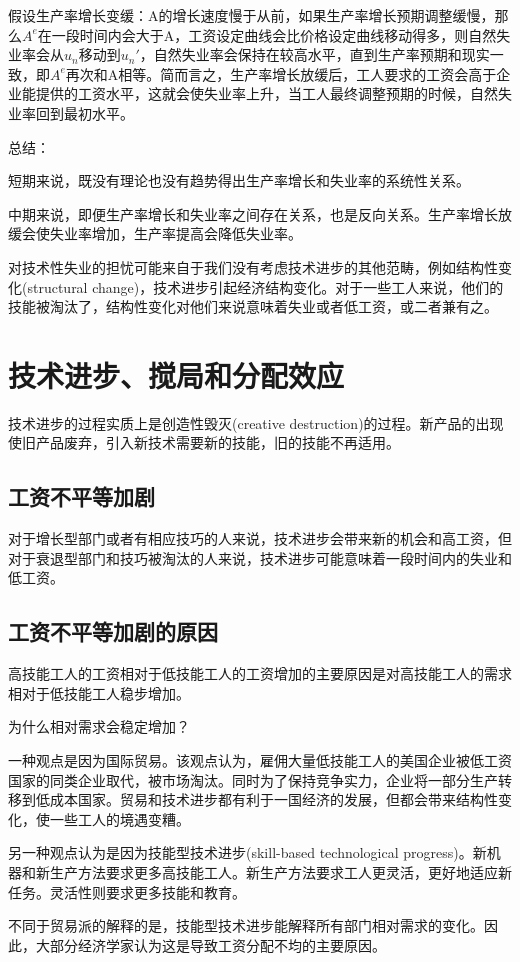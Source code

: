 \documentclass{article}
\begin{document}
假设生产率增长变缓：A的增长速度慢于从前，如果生产率增长预期调整缓慢，那么$ A^e $在一段时间内会大于A，工资设定曲线会比价格设定曲线移动得多，则自然失业率会从$ u_n $移动到$ u_n' $，自然失业率会保持在较高水平，直到生产率预期和现实一致，即$ A^e $再次和A相等。简而言之，生产率增长放缓后，工人要求的工资会高于企业能提供的工资水平，这就会使失业率上升，当工人最终调整预期的时候，自然失业率回到最初水平。

\hspace*{\fill}

总结：

短期来说，既没有理论也没有趋势得出生产率增长和失业率的系统性关系。

中期来说，即便生产率增长和失业率之间存在关系，也是反向关系。生产率增长放缓会使失业率增加，生产率提高会降低失业率。

对技术性失业的担忧可能来自于我们没有考虑技术进步的其他范畴，例如结构性变化(structural change)，技术进步引起经济结构变化。对于一些工人来说，他们的技能被淘汰了，结构性变化对他们来说意味着失业或者低工资，或二者兼有之。

\section{技术进步、搅局和分配效应}

技术进步的过程实质上是创造性毁灭(creative destruction)的过程。新产品的出现使旧产品废弃，引入新技术需要新的技能，旧的技能不再适用。

\subsection{工资不平等加剧}

对于增长型部门或者有相应技巧的人来说，技术进步会带来新的机会和高工资，但对于衰退型部门和技巧被淘汰的人来说，技术进步可能意味着一段时间内的失业和低工资。

\subsection{工资不平等加剧的原因}

高技能工人的工资相对于低技能工人的工资增加的主要原因是对高技能工人的需求相对于低技能工人稳步增加。

为什么相对需求会稳定增加？

一种观点是因为国际贸易。该观点认为，雇佣大量低技能工人的美国企业被低工资国家的同类企业取代，被市场淘汰。同时为了保持竞争实力，企业将一部分生产转移到低成本国家。贸易和技术进步都有利于一国经济的发展，但都会带来结构性变化，使一些工人的境遇变糟。

另一种观点认为是因为技能型技术进步(skill-based technological progress)。新机器和新生产方法要求更多高技能工人。新生产方法要求工人更灵活，更好地适应新任务。灵活性则要求更多技能和教育。

不同于贸易派的解释的是，技能型技术进步能解释所有部门相对需求的变化。因此，大部分经济学家认为这是导致工资分配不均的主要原因。






















	
	
\end{document}
